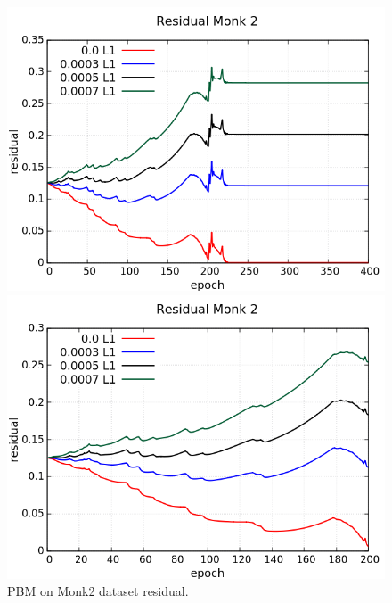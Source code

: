 \begin{figure}[H]
	\centering
	\begin{minipage}[t]{0.5\linewidth}
		\includegraphics[width=\linewidth]{data/PBM/Monk2/Monk2_PBM_Residual_standard.png}
	\end{minipage}%
	\begin{minipage}[t]{0.5\linewidth}
		\includegraphics[width=\linewidth]{data/PBM/Monk2/Monk2_PBM_Residual_zoom.png}
	\end{minipage}
	\caption{PBM on Monk2 dataset residual.}
\end{figure}
